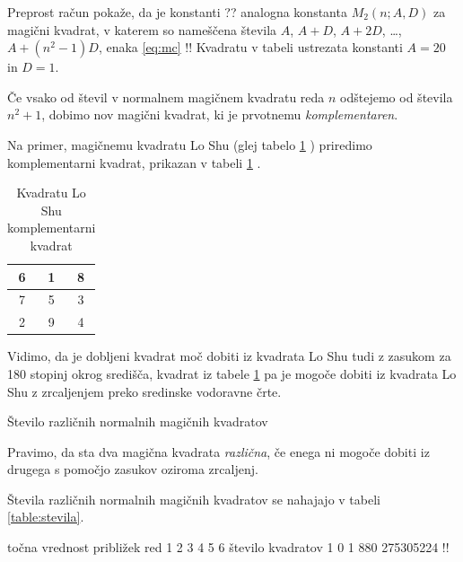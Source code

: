 \documentclass[a4paper,12pt]{article}
\begin{document}
Preprost račun pokaže, da je konstanti ?? analogna konstanta
$M_2(n;A,D)$ za magični kvadrat, v katerem so nameščena števila
$A$, $A+D$, $A+2D$, \dots, $A+(n^2-1)D$, enaka  \ref{eq:mc} %
!!
Kvadratu v tabeli  ustrezata konstanti $A=20$ in $D=1$.

      Če vsako od števil v normalnem magičnem kvadratu reda $n$ odštejemo
      od števila $n^2+1$, dobimo nov magični kvadrat, ki je prvotnemu
      \emph{komplementaren}.


Na primer, magičnemu kvadratu Lo Shu (glej tabelo  \ref{ttable:closhu} ) priredimo
komplementarni kvadrat, prikazan v tabeli \ref{ttable:closhu} .
%

\begin{table}[ht]
   \centering
   \caption{Kvadratu Lo Shu komplementarni kvadrat}
   \label{ttable:closhu}
   \begin{tabular}{|c|c|c|}
   \hline
   6 & 1 & 8 \\
   \hline
   7 & 5 & 3 \\
   \hline
   2 & 9 & 4 \\
   \hline
   \end{tabular}
   \end{table}
   

Vidimo, da je dobljeni kvadrat moč dobiti iz kvadrata Lo Shu tudi z zasukom za
180 stopinj okrog središča, kvadrat iz tabele \ref{ttable:closhu} pa je mogoče dobiti
iz kvadrata Lo Shu z zrcaljenjem preko sredinske vodoravne črte.

Število različnih normalnih magičnih kvadratov

\begin{definicija}%
      Pravimo, da sta dva magična kvadrata \emph{različna}, če enega ni mogoče dobiti
      iz drugega s pomočjo zasukov oziroma zrcaljenj.
   \end{definicija}%

Števila različnih normalnih magičnih kvadratov se nahajajo v tabeli \ref{table:stevila}.

      točna vrednost približek
      red 1 2 3 4 5 6
      število kvadratov 1 0 1 880 275305224 !!
\end{document}
